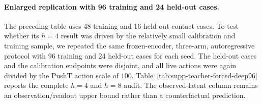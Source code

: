 \documentclass{article}
\begin{document}
\paragraph{Enlarged replication with 96 training and 24 held-out cases.}
The preceding table uses 48 training and 16 held-out contact cases. To test
whether its $h=4$ result was driven by the relatively small calibration and
training sample, we repeated the same frozen-encoder, three-arm, autoregressive
protocol with 96 training and 24 held-out cases for each seed. The held-out
cases and the calibration endpoints were disjoint, and all live actions were
again divided by the PushT action scale of $100$. Table~\ref{tab:supp-teacher-forced-deep96}
reports the complete $h=4$ and $h=8$ audit. The observed-latent column remains
an observation/readout upper bound rather than a counterfactual prediction.

\begin{table}[H]
\centering
\scriptsize
\setlength{\tabcolsep}{3pt}
\caption{Enlarged two-seed replication of the teacher-forced predictor repair.
Errors are $+a$ block-XY pixels; gains are base error minus repaired-calibrated
error. The three arm columns are point gains for matched $-a$ and zero
interventions. Intervals are episode-bootstrap 95\% intervals over 24 held-out
contact cases.}
\label{tab:supp-teacher-forced-deep96}
\end{table}
\end{document}
